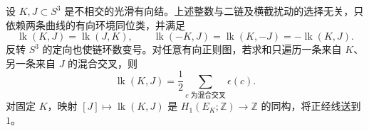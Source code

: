 \begin{proposition}\label{g2:prop:linking-number-properties}
	设 \(K,J\subset S^3\) 是不相交的光滑有向结。上述整数与二链及横截扰动的选择无关，只依赖两条曲线的有向环境同位类，并满足
	\[
		\operatorname{lk}(K,J)=\operatorname{lk}(J,K),\qquad
		\operatorname{lk}(-K,J)=\operatorname{lk}(K,-J)=-\operatorname{lk}(K,J).
	\]
	反转 \(S^3\) 的定向也使链环数变号。对任意有向正则图，若求和只遍历一条来自 \(K\)、另一条来自 \(J\) 的混合交叉，则
	\begin{equation}\label{g2:eq:linking-crossings}
		\operatorname{lk}(K,J)=\frac12\sum_{c\text{ 为混合交叉}}\epsilon(c).
	\end{equation}
	对固定 \(K\)，映射 \([J]\mapsto\operatorname{lk}(K,J)\) 是 \(H_1(E_K;\mathbb Z)\rightarrow\mathbb Z\) 的同构，将正经线送到 \(1\)。
\end{proposition}

